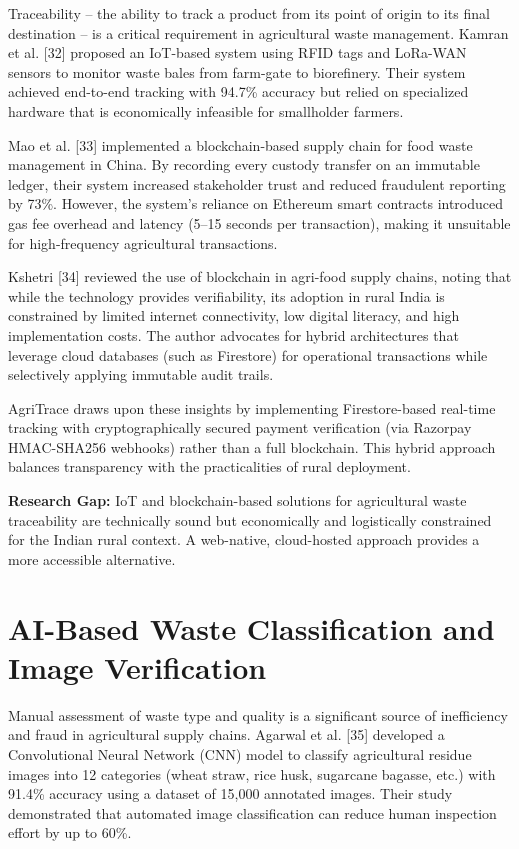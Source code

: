 \documentclass[a4paper,12pt,oneside]{report}
\begin{document}
\noindent Traceability -- the ability to track a product from its point of origin to its final destination -- is a critical requirement in agricultural waste management. Kamran et al. [32] proposed an IoT-based system using RFID tags and LoRa-WAN sensors to monitor waste bales from farm-gate to biorefinery. Their system achieved end-to-end tracking with 94.7\% accuracy but relied on specialized hardware that is economically infeasible for smallholder farmers.

Mao et al. [33] implemented a blockchain-based supply chain for food waste management in China. By recording every custody transfer on an immutable ledger, their system increased stakeholder trust and reduced fraudulent reporting by 73\%. However, the system's reliance on Ethereum smart contracts introduced gas fee overhead and latency (5--15 seconds per transaction), making it unsuitable for high-frequency agricultural transactions.

Kshetri [34] reviewed the use of blockchain in agri-food supply chains, noting that while the technology provides verifiability, its adoption in rural India is constrained by limited internet connectivity, low digital literacy, and high implementation costs. The author advocates for hybrid architectures that leverage cloud databases (such as Firestore) for operational transactions while selectively applying immutable audit trails.

AgriTrace draws upon these insights by implementing Firestore-based real-time tracking with cryptographically secured payment verification (via Razorpay HMAC-SHA256 webhooks) rather than a full blockchain. This hybrid approach balances transparency with the practicalities of rural deployment.

\textbf{Research Gap:} IoT and blockchain-based solutions for agricultural waste traceability are technically sound but economically and logistically constrained for the Indian rural context. A web-native, cloud-hosted approach provides a more accessible alternative.

\section{AI-Based Waste Classification and Image Verification}

\noindent Manual assessment of waste type and quality is a significant source of inefficiency and fraud in agricultural supply chains. Agarwal et al. [35] developed a Convolutional Neural Network (CNN) model to classify agricultural residue images into 12 categories (wheat straw, rice husk, sugarcane bagasse, etc.) with 91.4\% accuracy using a dataset of 15,000 annotated images. Their study demonstrated that automated image classification can reduce human inspection effort by up to 60\%.
\end{document}
